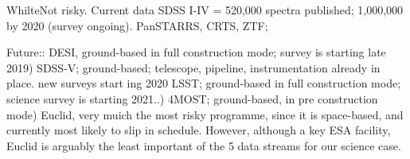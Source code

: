 
WhilteNot risky.  Current data SDSS
I-IV = 520,000 spectra published; 1,000,000 by 2020 (survey ongoing).
PanSTARRS, CRTS, ZTF;

Future:: DESI, ground-based in full construction mode; survey is
starting late 2019) SDSS-V; ground-based; telescope, pipeline,
instrumentation already in place. new surveys start ing 2020 LSST;
ground-based in full construction mode; science survey is starting
2021..)  4MOST; ground-based, in pre construction mode) Euclid, very
muich the most risky programme, since it is space-based, and currently
most likely to slip in schedule. However, although a key ESA facility,
Euclid is arguably the least important of the 5 data streams for our
science case.
